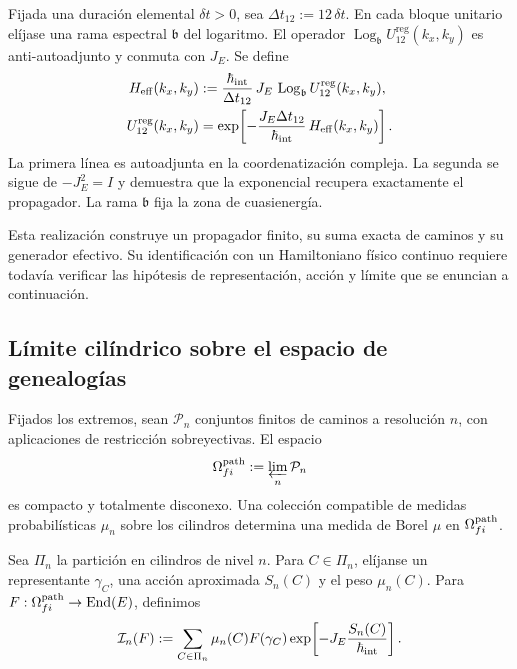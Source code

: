 Fijada una duración elemental \(\delta t>0\), sea
\(\Delta t_{12}:=12\,\delta t\). En cada bloque unitario elíjase una rama
espectral \(\mathfrak b\) del logaritmo. El operador
\(\operatorname{Log}_{\mathfrak b}U_{12}^{\mathrm{reg}}(k_x,k_y)\) es
anti-autoadjunto y conmuta con \(J_E\). Se define
\begin{equation}
 \begin{aligned}
 H_{\rm eff}(k_x,k_y)
 &:=
 \frac{\hbar_{\rm int}}{\Delta t_{12}}\,
 J_E\,
 \operatorname{Log}_{\mathfrak b}
 U_{12}^{\mathrm{reg}}(k_x,k_y),\\
 U_{12}^{\mathrm{reg}}(k_x,k_y)
 &=
 \exp\!\left[
  -\frac{J_E\Delta t_{12}}{\hbar_{\rm int}}\,
  H_{\rm eff}(k_x,k_y)
 \right].
 \end{aligned}
 \label{eq:hamiltoniano-efectivo-registro-27-rev3}
\end{equation}
La primera línea es autoadjunta en la coordenatización compleja. La segunda se sigue de
\(-J_E^2=I\) y demuestra que la exponencial recupera exactamente el
propagador. La rama \(\mathfrak b\) fija la zona de cuasienergía.

Esta realización construye un propagador finito, su suma exacta de caminos y
su generador efectivo. Su identificación con un Hamiltoniano físico continuo
requiere todavía verificar las hipótesis de representación, acción y límite
que se enuncian a continuación.

\subsection{Límite cilíndrico sobre el espacio de genealogías}

Fijados los extremos, sean \(\mathcal P_n\) conjuntos finitos de caminos a
resolución \(n\), con aplicaciones de restricción sobreyectivas. El espacio
\[
 \Omega^{\rm path}_{fi}:=\varprojlim_n\mathcal P_n
\]
es compacto y totalmente disconexo. Una colección compatible de medidas
probabilísticas \(\mu_n\) sobre los cilindros determina una medida de Borel
\(\mu\) en \(\Omega^{\rm path}_{fi}\).

Sea \(\Pi_n\) la partición en cilindros de nivel \(n\). Para
\(C\in\Pi_n\), elíjanse un representante \(\gamma_C\), una acción aproximada
\(S_n(C)\) y el peso \(\mu_n(C)\). Para
\(F:\Omega^{\rm path}_{fi}\to\operatorname{End}(E)\), definimos
\begin{equation}
 \mathcal I_n(F)
 :=\sum_{C\in\Pi_n}\mu_n(C)F(\gamma_C)
 \exp\!\left[-J_E\frac{S_n(C)}{\hbar_{\rm int}}\right].
 \label{eq:integral-cilindrica-aproximante-rev2}
\end{equation}

